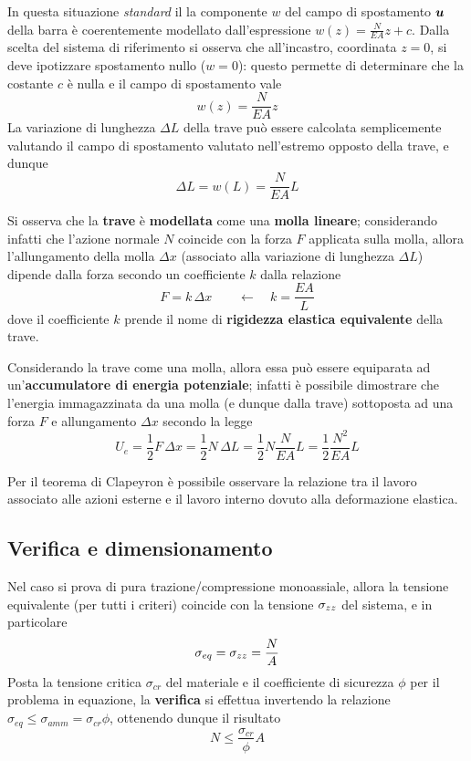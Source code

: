 		In questa situazione \textit{standard} il la componente $w$ del campo di spostamento $\boldsymbol{u}$ della barra è coerentemente modellato dall'espressione $w(z) = \frac N{EA}z + c$. Dalla scelta del sistema di riferimento si osserva che all'incastro, coordinata $z=0$, si deve ipotizzare spostamento nullo ($w=0$): questo permette di determinare che la costante $c$ è nulla e il campo di spostamento vale
		\[ w(z) = \frac N{EA}z  \]
		La variazione di lunghezza $\Delta L$ della trave può essere calcolata semplicemente valutando il campo di spostamento valutato nell'estremo opposto della trave, e dunque
		\[ \Delta L = w(L) = \frac{N}{EA}L \]
		
		\begin{concetto}
			Si osserva che la \textbf{trave} è \textbf{modellata} come una \textbf{molla lineare}; considerando infatti che l'azione normale $N$ coincide con la forza $F$ applicata sulla molla, allora l'allungamento della molla $\Delta x$ (associato alla variazione di lunghezza $\Delta L$) dipende dalla forza secondo un coefficiente $k$ dalla relazione
			\begin{equation}
				F = k\, \Delta x \qquad \leftarrow \quad k = \frac {EA} L
			\end{equation}
			dove il coefficiente $k$ prende il nome di \textbf{rigidezza elastica equivalente} della trave.
		\end{concetto}
		Considerando la trave come una molla, allora essa può essere equiparata ad un'\textbf{accumulatore di energia potenziale}; infatti è possibile dimostrare che l'energia immagazzinata da una molla (e dunque dalla trave) sottoposta ad una forza $F$ e allungamento $\Delta x$ secondo la legge
		\begin{equation}
			U_e = \frac 1 2 F\, \Delta x = \frac 1 2 N \, \Delta L = \frac 1 2 N \frac N{EA}L  = \frac 1 2 \frac{N^2}{EA}L
		\end{equation}
		\begin{osservazione}
			Per il teorema di Clapeyron è possibile osservare la relazione tra il lavoro associato alle azioni esterne e il lavoro interno dovuto alla deformazione elastica.
		\end{osservazione}
	
	\subsection{Verifica e dimensionamento}
		Nel caso si prova di pura trazione/compressione monoassiale, allora la tensione equivalente (per tutti i criteri) coincide con la tensione $\sigma_{zz}$ del sistema, e in particolare
		\[ \sigma_{eq} = \sigma_{zz} = \frac NA \]
		Posta la tensione critica $\sigma_{cr}$ del materiale e il coefficiente di sicurezza $\phi$ per il problema in equazione, la \textbf{verifica} si effettua invertendo la relazione $\sigma_{eq} \leq \sigma_{amm} = \sigma_{cr}\phi$, ottenendo dunque il risultato
		\[ N \leq \frac{\sigma_{cr}}{\phi} A \]
		
